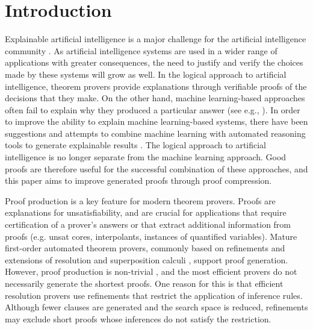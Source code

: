 \section{Introduction} 

Explainable artificial intelligence is a major challenge for the artificial intelligence community \cite{bonacina2017automated}.
As artificial intelligence systems are used in a wider range of applications with greater consequences, the need to justify and verify the choices made by these systems will grow as well.
In the logical approach to artificial intelligence, theorem provers provide explanations through verifiable proofs of the decisions that they make.
On the other hand, machine learning-based approaches often fail to explain why they produced a particular answer (see e.g., \cite{miller2019explanation}). 
In order to improve the ability to explain machine learning-based systems, there have been suggestions and attempts to combine machine learning with automated reasoning tools to generate explainable results \cite{bonacina2017automated,siebert2019corg}. 
The logical approach to artificial intelligence is no longer separate from the machine learning approach.
Good proofs are therefore useful for the successful combination of these approaches, and this paper aims to improve generated proofs through proof compression.

Proof production is a key feature for modern theorem provers. 
Proofs are explanations for unsatisfiability, and are crucial for applications that require certification of a prover's answers or that extract additional information from proofs (e.g. unsat cores, interpolants, instances of quantified variables).
Mature first-order automated theorem provers, commonly based on refinements and extensions of resolution and superposition calculi \cite{Vampire,EProver,Spass,spassT,Beagle,cruanes2015extending,prover9-mace4}, support proof generation. 
However, proof production is non-trivial \cite{SchulzAPPA}, and the most efficient provers do not necessarily generate the shortest proofs.
One reason for this is that efficient resolution provers use refinements that restrict the application of inference rules.
Although fewer clauses are generated and the search space is reduced, refinements may exclude short proofs whose inferences do not satisfy the restriction.

